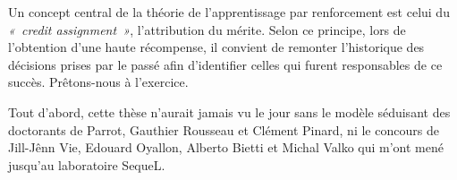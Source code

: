 
\begin{acknowledgements}
Un concept central de la théorie de l'apprentissage par renforcement est celui du \emph{«~credit assignment~»}, l'attribution du mérite. Selon ce principe, lors de l'obtention d'une haute récompense, il convient de remonter l'historique des décisions prises par le passé afin d'identifier celles qui furent responsables de ce succès.
Prêtons-nous à l'exercice.

Tout d'abord, cette thèse n’aurait jamais vu le jour sans le modèle séduisant des doctorants de Parrot, Gauthier Rousseau et Clément Pinard, ni le concours de Jill-Jênn Vie, Edouard Oyallon, Alberto Bietti et Michal Valko qui m'ont mené jusqu'au laboratoire SequeL.


\end{acknowledgements}

